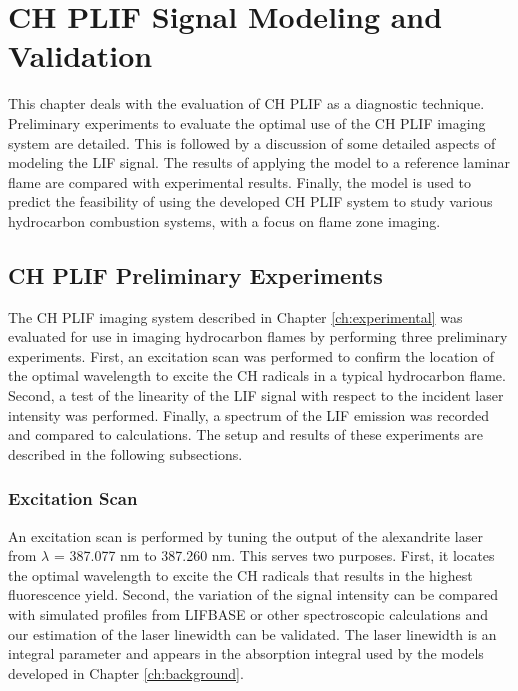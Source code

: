 \chapter{CH PLIF Signal Modeling and Validation}
\label{ch:chplif}

This chapter deals with the evaluation of CH PLIF as a diagnostic technique.
Preliminary experiments to evaluate the optimal use of the CH PLIF imaging system are detailed.
This is followed by a discussion of some detailed aspects of modeling the LIF signal.
The results of applying the model to a reference laminar flame are compared with experimental results.
Finally, the model is used to predict the feasibility of using the developed CH PLIF system to study various hydrocarbon combustion systems, with a focus on flame zone imaging.

\section{CH PLIF Preliminary Experiments}
\label{sec:chplif-preliminary-experiments}

The CH PLIF imaging system described in Chapter \ref{ch:experimental} was evaluated for use in imaging hydrocarbon flames by performing three preliminary experiments.
First, an excitation scan was performed to confirm the location of the optimal wavelength to excite the CH radicals in a typical hydrocarbon flame.
Second, a test of the linearity of the LIF signal with respect to the incident laser intensity was performed.
Finally, a spectrum of the LIF emission was recorded and compared to calculations.
The setup and results of these experiments are described in the following subsections.

\subsection{Excitation Scan}
\label{subsec:prelim-excitation-scan}

An excitation scan is performed by tuning the output of the alexandrite laser from \(\lambda\) = 387.077 nm to 387.260 nm.
This serves two purposes.
First, it locates the optimal wavelength to excite the CH radicals that results in the highest fluorescence yield.
Second, the variation of the signal intensity can be compared with simulated profiles from LIFBASE\cite{1999-luque-a} or other spectroscopic calculations and our estimation of the laser linewidth can be validated.
The laser linewidth is an integral parameter and appears in the absorption integral used by the models developed in Chapter \ref{ch:background}.

